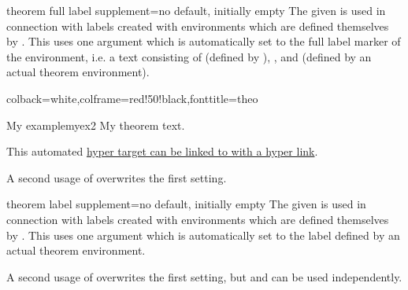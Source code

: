 \clearpage

\begin{docTcbKey}[][doc new=2018-01-12]{theorem full label supplement}{=}{no default, initially empty}
  The given  is used in connection with labels created with environments which
  are defined themselves by .
  This  uses one argument which is automatically set to the
  full label marker of the environment, i.e. a text consisting of
   (defined by ),
  ,
  and  (defined by an actual theorem environment).

\begin{dispExample}
{}

%
   {colback=white,colframe=red!50!black,fonttitle=\bfseries}{theo}
\begin{sometheorem}{My example}{myex2}
My theorem text.
\end{sometheorem}
This automated \hyperlink{theo:myex2}{hyper target can be linked to with a
 hyper link}.
\end{dispExample}

A second usage of  overwrites
the first setting.
\end{docTcbKey}


\begin{docTcbKey}[][doc new=2018-01-12]{theorem label supplement}{=}{no default, initially empty}
  The given  is used in connection with labels created with environments which
  are defined themselves by .
  This  uses one argument which is automatically set to the
  label  defined by an actual theorem environment.\par
  A second usage of  overwrites
  the first setting, but
  and  can be used independently.

\end{docTcbKey}


